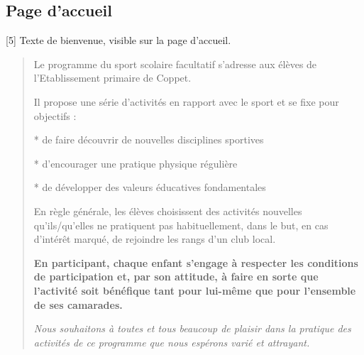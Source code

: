 \documentclass[letterpaper,10pt,english]{sphinxmanual}
\begin{document}
\subsection{Page d'accueil}
\label{configurer:page-d-accueil}
{[}5{]} Texte de bienvenue, visible sur la page d'accueil.
\begin{quote}\begin{description}
\item[{Exemple}] \leavevmode
\begin{DUlineblock}{0em}
\item[] Le programme du sport scolaire facultatif s’adresse aux élèves de l’Etablissement primaire de Coppet.
\item[] 
\item[] Il propose une série d’activités en rapport avec le sport et se fixe pour objectifs :
\item[]
\begin{DUlineblock}{\DUlineblockindent}
\item[] * de faire découvrir de nouvelles disciplines sportives
\item[] * d’encourager une pratique physique régulière
\item[] * de développer des valeurs éducatives fondamentales
\end{DUlineblock}
\item[] En règle générale, les élèves choisissent des activités nouvelles qu’ils/qu’elles ne pratiquent pas habituellement, dans le but, en cas d’intérêt marqué, de rejoindre les rangs d’un club local.
\item[] 
\item[] \textbf{En participant, chaque enfant s’engage à respecter les conditions de participation et, par son attitude, à faire en sorte que l’activité soit bénéfique tant pour lui-même que pour l’ensemble de ses camarades.}
\item[] 
\item[] \emph{Nous souhaitons à toutes et tous beaucoup de plaisir dans la pratique des activités de ce programme que nous espérons varié et attrayant.}
\end{DUlineblock}

\end{description}\end{quote}
\end{document}

